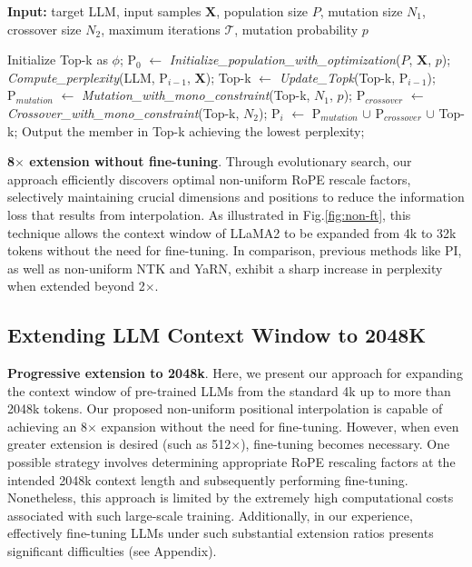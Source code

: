 \begin{algorithm}[t]
	\small
	\caption{The search algorithm}
	\textbf{Input:} target LLM, input samples $\mathbf{X}$, population size $P$, mutation size $N_1$, crossover size $N_2$, maximum iterations $\mathcal{T}$, mutation probability $p$ \\

	\begin{algorithmic}[1]
		\label{alg:search}
		\STATE Initialize Top-k as $\phi$;
		\STATE $\text{P}_0$ $\gets$ \textit{Initialize\_population\_with\_optimization}($P$, $\mathbf{X}$, $p$); 
		\STATE \textit{Compute\_perplexity}(LLM, $\text{P}_{i-1}$, $\mathbf{X}$);
		\STATE Top-k $\gets$ \textit{Update\_Topk}(Top-k, $\text{P}_{i-1}$);
		\STATE $\text{P}_{mutation}$ $\gets$ \textit{Mutation\_with\_mono\_constraint}(Top-k, $N_1$, $p$); 
		\STATE $\text{P}_{crossover}$ $\gets$ \textit{Crossover\_with\_mono\_constraint}(Top-k, $N_2$);
		\STATE $\text{P}_i$ $\gets$ $\text{P}_{mutation}$ $\cup$ $\text{P}_{crossover}$ $\cup$ Top-k;
		\ENDFOR
		\STATE Output the member in Top-k achieving the lowest perplexity;
	\end{algorithmic}
\end{algorithm}

\textbf{8$\times$ extension without fine-tuning}. Through evolutionary search, our approach efficiently discovers optimal non-uniform RoPE rescale factors, selectively maintaining crucial dimensions and positions to reduce the information loss that results from interpolation. As illustrated in Fig.\ref{fig:non-ft}, this technique allows the context window of LLaMA2 to be expanded from 4k to 32k tokens without the need for fine-tuning. In comparison, previous methods like PI, as well as non-uniform NTK and YaRN, exhibit a sharp increase in perplexity when extended beyond 2$\times$.

\subsection{Extending LLM Context Window to 2048K}
\label{sec:extendto2048k}

\textbf{Progressive extension to 2048k}. Here, we present our approach for expanding the context window of pre-trained LLMs from the standard 4k up to more than 2048k tokens. Our proposed non-uniform positional interpolation is capable of achieving an 8$\times$ expansion without the need for fine-tuning. However, when even greater extension is desired (such as 512$\times$), fine-tuning becomes necessary. One possible strategy involves determining appropriate RoPE rescaling factors at the intended 2048k context length and subsequently performing fine-tuning. Nonetheless, this approach is limited by the extremely high computational costs associated with such large-scale training. Additionally, in our experience, effectively fine-tuning LLMs under such substantial extension ratios presents significant difficulties (see Appendix).

